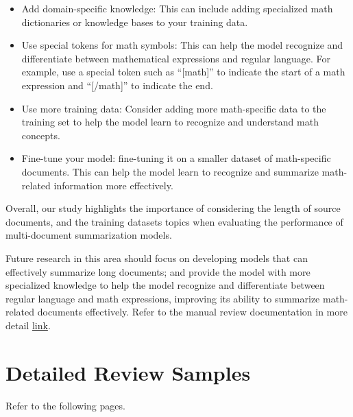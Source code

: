 \documentclass[12pt, twocolumn]{article}
\numberwithin{equation}{section}
\begin{document}
\begin{itemize}
    \item Add domain-specific knowledge: This can include adding specialized math dictionaries or knowledge bases to your training data. 
    \item Use special tokens for math symbols: This can help the model recognize and differentiate between mathematical expressions and regular language. For example, use a special token such as ``[math]'' to indicate the start of a math expression and ``[/math]'' to indicate the end.
    \item Use more training data: Consider adding more math-specific data to the training set to help the model learn to recognize and understand math concepts.
    \item Fine-tune your model: fine-tuning it on a smaller dataset of math-specific documents. This can help the model learn to recognize and summarize math-related information more effectively.
\end{itemize}

Overall, our study highlights the importance of considering the length of source documents, and the training datasets topics when evaluating the performance of multi-document summarization models. 

Future research in this area should focus on developing models that can effectively summarize long documents; and provide the model with more specialized knowledge to help the model recognize and differentiate between regular language and math expressions, improving its ability to summarize math-related documents effectively. Refer to the manual review documentation in more detail \href{https://drive.google.com/file/d/1sPLj4a-rafh1EjOR7l_QMveexfoaxq3y/view?usp=share_link}{link}.

\section{Detailed Review Samples}
\label{app:samples}

Refer to the following pages.

{
    
    
}

\newpage
\hspace{1cm}
\newpage

\end{document}
